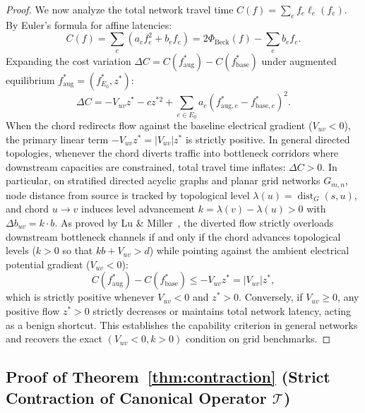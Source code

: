 \documentclass[11pt,a4paper]{article}
\begin{document}
\begin{proof}
We now analyze the total network travel time $C(f) = \sum_{e} f_e \ell_e(f_e)$. By Euler's formula for affine latencies:
\begin{equation}
C(f) = \sum_e (a_e f_e^2 + b_e f_e) = 2 \Phi_{\text{Beck}}(f) - \sum_e b_e f_e.
\end{equation}
Expanding the cost variation $\Delta C = C(f_{\text{aug}}^*) - C(f_{\text{base}}^*)$ under augmented equilibrium $f_{\text{aug}}^* = (f_{E_0}^*, z^*)$:
\begin{equation}
\Delta C = -V_{uv} z^* - c z^{*2} + \sum_{e \in E_0} a_e (f_{\text{aug}, e}^* - f_{\text{base}, e}^*)^2.
\end{equation}
When the chord redirects flow against the baseline electrical gradient ($V_{uv} < 0$), the primary linear term $-V_{uv} z^* = |V_{uv}| z^*$ is strictly positive. In general directed topologies, whenever the chord diverts traffic into bottleneck corridors where downstream capacities are constrained, total travel time inflates: $\Delta C > 0$. In particular, on stratified directed acyclic graphs and planar grid networks $G_{m,n}$, node distance from source is tracked by topological level $\lambda(u) = \operatorname{dist}_G(s, u)$, and chord $u \to v$ induces level advancement $k = \lambda(v) - \lambda(u) > 0$ with $\Delta b_{uv} = k \cdot b$. As proved by Lu \& Miller~\cite{lu2026braess}, the diverted flow strictly overloads downstream bottleneck channels if and only if the chord advances topological levels ($k > 0$ so that $k b + V_{uv} > d$) while pointing against the ambient electrical potential gradient ($V_{uv} < 0$):
\begin{equation}
C(f_{\text{aug}}^*) - C(f_{\text{base}}^*) \le -V_{uv} z^* = |V_{uv}| z^*,
\end{equation}
which is strictly positive whenever $V_{uv} < 0$ and $z^* > 0$. Conversely, if $V_{uv} \ge 0$, any positive flow $z^* > 0$ strictly decreases or maintains total network latency, acting as a benign shortcut. This establishes the capability criterion in general networks and recovers the exact $(V_{uv} < 0, k > 0)$ condition on grid benchmarks.
\end{proof}

\subsection{Proof of Theorem~\ref{thm:contraction} (Strict Contraction of Canonical Operator \texorpdfstring{$\mathcal{T}$}{T})}
\label{subsec:proof_thm2}
\end{document}
